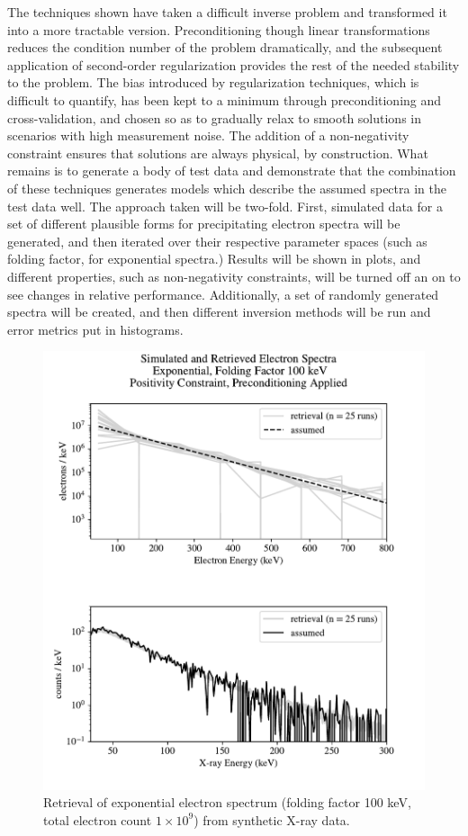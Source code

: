 The techniques shown have taken a difficult inverse problem and transformed it into a more tractable version. Preconditioning though linear transformations reduces the condition number of the problem dramatically, and the subsequent application of second-order regularization provides the rest of the needed stability to the problem. The bias introduced by regularization techniques, which is difficult to quantify, has been kept to a minimum through preconditioning and cross-validation, and chosen so as to gradually relax to smooth solutions in scenarios with high measurement noise. The addition of a non-negativity constraint ensures that solutions are always physical, by construction. What remains is to generate a body of test data and demonstrate that the combination of these techniques generates models which describe the assumed spectra in the test data well. The approach taken will be two-fold. First, simulated data for a set of different plausible forms for precipitating electron spectra will be generated, and then iterated over their respective parameter spaces (such as folding factor, for exponential spectra.) Results will be shown in plots, and different properties, such as non-negativity constraints, will be turned off an on to see changes in relative performance. Additionally, a set of randomly generated spectra will be created, and then different inversion methods will be run and error metrics put in histograms. 

\begin{figure}[p]
    \centering
    \includegraphics[width=\textwidth]{figures/chapter_4/synthetic_data_examples/exponential_folding_100keV_posonly_preconditioning_1e9_particles}
    \caption{Retrieval of exponential electron spectrum (folding factor 100 keV, total electron count $1\times10^9$) from synthetic X-ray data.}
    \label{why_non_negative_is_good}
\end{figure}

